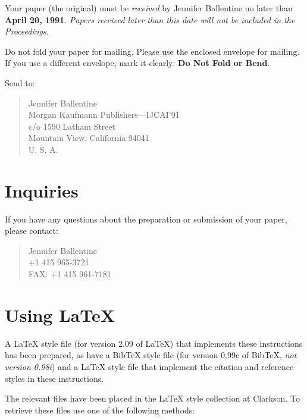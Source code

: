 Your paper (the original) must be {\em received\/} by 
Jennifer Ballentine %
no later than 
{\bf April 20, 1991}. %
{\em Papers received later than this date will not be included in the Proceedings.}

Do not fold your paper for mailing.  Please use the enclosed envelope for
mailing.  If you use a different envelope, mark it clearly: {\bf Do Not
Fold or Bend}. 

Send to:
\begin{quote}
Jennifer Ballentine\\
Morgan Kaufmann Publishers---IJCAI'91\\
c/o 1590 Latham Street\\
Mountain View, California \hspace{1em} 94041\\
U. S. A.
\end{quote}

\section{Inquiries}

If you have any questions about the preparation or submission of your
paper, please contact:
\begin{quote}
Jennifer Ballentine\\
+1 415 965-3721\\
FAX: +1 415 961-7181
\end{quote}

\appendix


\section{Using \LaTeX{}}\label{latex}

A \LaTeX{} style file (for version 2.09 of \LaTeX{}) that implements these
instructions has been prepared, as have a Bib\TeX{} style file (for version
0.99c of Bib\TeX{}, {\em not version 0.98i}) and a LaTeX style file that
implement the citation and reference styles in these instructions.

The relevant files have been placed in the \LaTeX{} style collection at
Clarkson.  To retrieve these files use one of the following methods:

